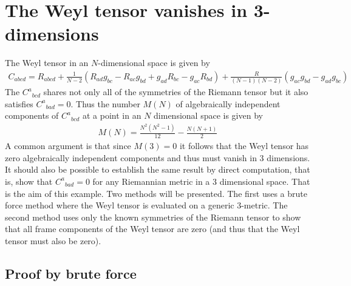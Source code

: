 \documentclass[a4paper,12pt]{article}
\numberwithin{equation}{section}%
\begin{document}
\clearpage

\section{The Weyl tensor vanishes in 3-dimensions}
\label{sec:ex-13}
\setcounter{ExerciseNum}{0}



The Weyl tensor in an $N$-dimensional space is given by
\begin{align*}
   C_{a b c d} = R_{a b c d} + \frac{1}{N-2} (  R_{a d} g_{b c} - R_{a c} g_{b d}
                                              + g_{a d} R_{b c} - g_{a c} R_{b d})
                             + \frac{R}{(N-1)(N-2)} (g_{a c} g_{b d} - g_{a d} g_{b c})
\end{align*}
The $C^{a}{}_{bcd}$ shares not only all of the symmetries of the Riemann tensor
but it also satisfies $C^{a}{}_{bad}=0$. Thus the number $M(N)$ of algebraically independent
components of $C^{a}{}_{bcd}$ at a point in an $N$ dimensional space is given by
\begin{align*}
   M(N) = \frac{N^2(N^2-1)}{12} - \frac{N(N+1)}{2}
\end{align*}
A common argument is that since $M(3)=0$ it follows that the Weyl tensor has zero
algebraically independent components and thus must vanish in 3 dimensions. It should also be
possible to establish the same result by direct computation, that is, show that
$C^{a}{}_{bad}=0$ for any Riemannian metric in a 3 dimensional space. That is the aim of
this example. Two methods will be presented. The first uses a brute force method where
the Weyl tensor is evaluated on a generic 3-metric. The second method uses only the known
symmetries of the Riemann tensor to show that all frame components of the Weyl tensor are
zero (and thus that the Weyl tensor must also be zero).

\subsection{Proof by brute force}
\end{document}
